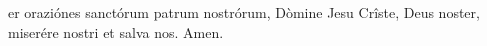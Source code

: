 er oraziónes sanctórum patrum nostrórum, Dòmine Jesu Crîste, Deus noster, miserére nostri et salva nos.
Amen.
